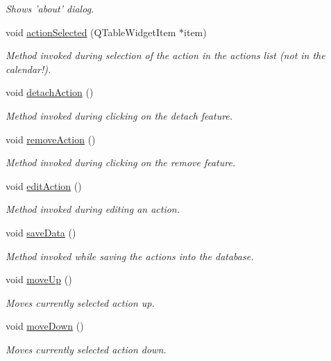 \begin{DoxyCompactItemize}
\begin{DoxyCompactList}\small\item\em Shows 'about' dialog. \end{DoxyCompactList}\item 
void \hyperlink{classmain_win_aef242a8707d462171f02a6156d5a949e}{action\-Selected} (Q\-Table\-Widget\-Item $\ast$item)
\begin{DoxyCompactList}\small\item\em Method invoked during selection of the action in the actions list (not in the calendar!). \end{DoxyCompactList}\item 
void \hyperlink{classmain_win_a1833795590c91fa73da6a224f31ce5d2}{detach\-Action} ()
\begin{DoxyCompactList}\small\item\em Method invoked during clicking on the detach feature. \end{DoxyCompactList}\item 
void \hyperlink{classmain_win_a16012c30ebbfc2f89537df405f9662dc}{remove\-Action} ()
\begin{DoxyCompactList}\small\item\em Method invoked during clicking on the remove feature. \end{DoxyCompactList}\item 
void \hyperlink{classmain_win_ac891fd8165e421e0aafcc1fb3574df40}{edit\-Action} ()
\begin{DoxyCompactList}\small\item\em Method invoked during editing an action. \end{DoxyCompactList}\item 
void \hyperlink{classmain_win_a38e7757a0783951f6e0d2d35f6a95dcb}{save\-Data} ()
\begin{DoxyCompactList}\small\item\em Method invoked while saving the actions into the database. \end{DoxyCompactList}\item 
void \hyperlink{classmain_win_afdd988d05727d738cd482a8f1e07e3fe}{move\-Up} ()
\begin{DoxyCompactList}\small\item\em Moves currently selected action up. \end{DoxyCompactList}\item 
void \hyperlink{classmain_win_a92d52556b5fc642b7e39b2fad67640fc}{move\-Down} ()
\begin{DoxyCompactList}\small\item\em Moves currently selected action down. \end{DoxyCompactList}\item 

\end{DoxyCompactItemize}

